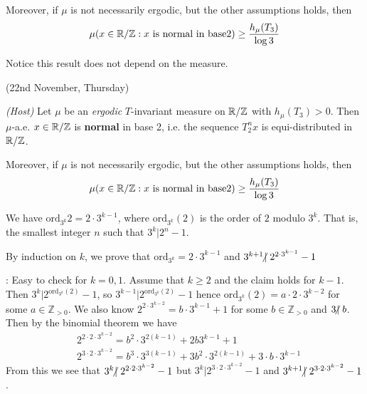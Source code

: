 \documentclass[12pt,a4paper]{report}
\newenvironment{proof}
{\begin{changemargin}{1cm}{0.5cm} 
	}%
	{\end{changemargin}
}
\newenvironment{subproof}
{\begin{changemargin}{0.5cm}{0.5cm}
	}%
	{\end{changemargin}
}
\begin{document}
\quad Moreover, if $\mu$ is not necessarily ergodic, but the other assumptions holds, then
\begin{align*}
\mu (x\in \mathbb{R}/\mathbb{Z} : x \text{ is normal in base} 2) \geq \frac{h_{\mu}(T_3)}{\log 3}
\end{align*}

Notice this result does not depend on the measure.
\s

\newday

(22nd November, Thursday)
\s

\thm \emph{(Host)} Let $\mu$ be an \emph{ergodic} $T$-invariant measure on $\mathbb{R}/\mathbb{Z}$ with $h_{\mu}(T_3)>0$. Then $\mu$-a.e. $x\in \mathbb{R}/\mathbb{Z}$ is \textbf{normal} in base 2, i.e. the sequence $T_2^n x$ is equi-distributed in $\mathbb{R}/ \mathbb{Z}$.

\quad Moreover, if $\mu$ is not necessarily ergodic, but the other assumptions holds, then
\begin{align*}
\mu (x\in \mathbb{R}/\mathbb{Z} : x \text{ is normal in base} 2) \geq \frac{h_{\mu}(T_3)}{\log 3}
\end{align*}
\s

\lem We have $\text{ord}_{3^k}{2} = 2 \cdot 3^{k-1}$, where $\text{ord}_{3^k}(2)$ is the order of $2$ modulo $3^k$. That is, the smallest integer $n$ such that $3^k | 2^n -1$.
\begin{proof}
\pf By induction on $k$, we prove that $\text{ord}_{3^k} = 2\cdot 3^{k-1}$ and $3^{k+1} \hspace{-5pt}\not|\hspace{3pt} 2^{2\cdot 3^{k-1}} -1$
\begin{subproof}
: Easy to check for $k=0,1$. Assume that $k\geq 2$ and the claim holds for $k-1$. Then $3^k | 2^{\text{ord}_{3^k}(2)} -1$, so $3^{k-1} | 2^{\text{ord}_{3^k}(2)}-1$ hence $\text{ord}_{3^k}(2)=a\cdot 2\cdot 3^{k-2}$ for some $a\in \mathbb{Z}_{>0}$. We also know $2^{2\cdot 3^{k-2}} = b\cdot 3^{k-1} +1$ for some $b\in \mathbb{Z}_{>0}$ and $3\hspace{-5pt}\not|\hspace{3pt} b$. Then by the binomial theorem we have
\begin{align*}
& 2^{2\cdot 2\cdot 3^{k-2}} = b^2 \cdot 3^{2(k-1)} + 2b3^{k-1} +1 \\
& 2^{3\cdot 2\cdot 3^{k-2}} = b^3 \cdot 3^{3(k-1)} + 3b^2\cdot 3^{2(k-1)} + 3\cdot b\cdot 3^{k-1}
\end{align*}
From this we see that $3^k \hspace{-5pt}\not|\hspace{3pt} 2^{2\cdot 2 \cdot 3^{k-2}} -1$ but $3^k | 2^{3\cdot 2\cdot 3^{k-2}} -1$ and $3^{k+1} \hspace{-5pt}\not|\hspace{3pt} 2^{3\cdot 2\cdot 3^{k-2}} -1$.
\end{subproof}

\eop
\end{proof}
\s
\end{document}
